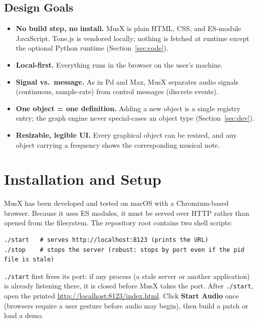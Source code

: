 \documentclass[11pt,letterpaper]{article}
\begin{document}
\subsection{Design Goals}

\begin{itemize}
  \item \textbf{No build step, no install.} MusX is plain HTML, CSS, and ES-module
        JavaScript. Tone.js is vendored locally; nothing is fetched at runtime except the
        optional Python runtime (Section~\ref{sec:code}).
  \item \textbf{Local-first.} Everything runs in the browser on the user's machine.
  \item \textbf{Signal vs.\ message.} As in Pd and Max, MusX separates audio signals
        (continuous, sample-rate) from control messages (discrete events).
  \item \textbf{One object = one definition.} Adding a new object is a single registry
        entry; the graph engine never special-cases an object type
        (Section~\ref{sec:dev}).
  \item \textbf{Resizable, legible UI.} Every graphical object can be resized, and any
        object carrying a frequency shows the corresponding musical note.
\end{itemize}

\section{Installation and Setup}

MusX has been developed and tested on macOS with a Chromium-based browser. Because it uses
ES modules, it must be served over HTTP rather than opened from the filesystem. The
repository root contains two shell scripts:

\begin{lstlisting}
./start   # serves http://localhost:8123 (prints the URL)
./stop    # stops the server (robust: stops by port even if the pid file is stale)
\end{lstlisting}

\texttt{./start} first frees its port: if any process (a stale server or another
application) is already listening there, it is closed before MusX takes the port. After
\texttt{./start}, open the printed \url{http://localhost:8123/index.html}. Click
\textbf{Start Audio} once (browsers require a user gesture before audio may begin), then
build a patch or load a demo.
\end{document}
